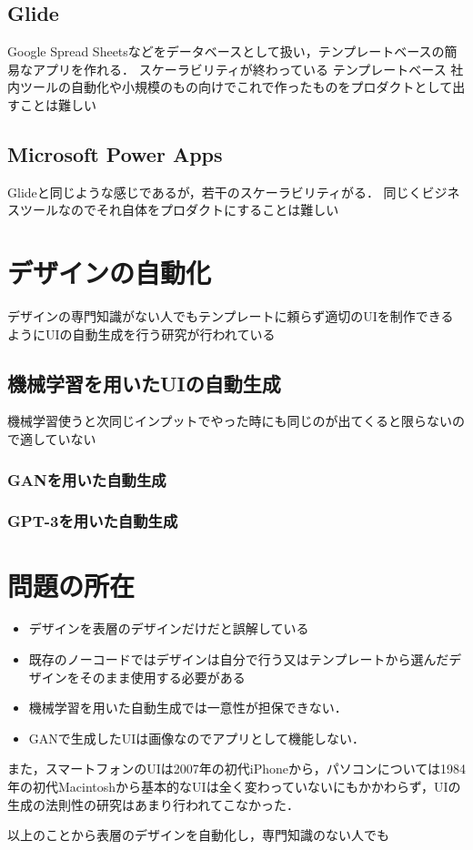 \subsection{Glide}
Google Spread Sheetsなどをデータベースとして扱い，テンプレートベースの簡易なアプリを作れる．
スケーラビリティが終わっている
テンプレートベース
社内ツールの自動化や小規模のもの向けでこれで作ったものをプロダクトとして出すことは難しい


\subsection{Microsoft Power Apps}
Glideと同じような感じであるが，若干のスケーラビリティがる．
同じくビジネスツールなのでそれ自体をプロダクトにすることは難しい

\section{デザインの自動化}
デザインの専門知識がない人でもテンプレートに頼らず適切のUIを制作できるようにUIの自動生成を行う研究が行われている
\subsection{機械学習を用いたUIの自動生成}
機械学習使うと次同じインプットでやった時にも同じのが出てくると限らないので適していない
\subsubsection{GANを用いた自動生成}

\subsubsection{GPT-3を用いた自動生成}

\section{問題の所在}

\begin{itemize}
	\item デザインを表層のデザインだけだと誤解している %
	\item 既存のノーコードではデザインは自分で行う又はテンプレートから選んだデザインをそのまま使用する必要がある
	\item 機械学習を用いた自動生成では一意性が担保できない．
	\item GANで生成したUIは画像なのでアプリとして機能しない．
\end{itemize}
また，スマートフォンのUIは2007年の初代iPhoneから，パソコンについては1984年の初代Macintoshから基本的なUIは全く変わっていないにもかかわらず，UIの生成の法則性の研究はあまり行われてこなかった．


以上のことから表層のデザインを自動化し，専門知識のない人でも
